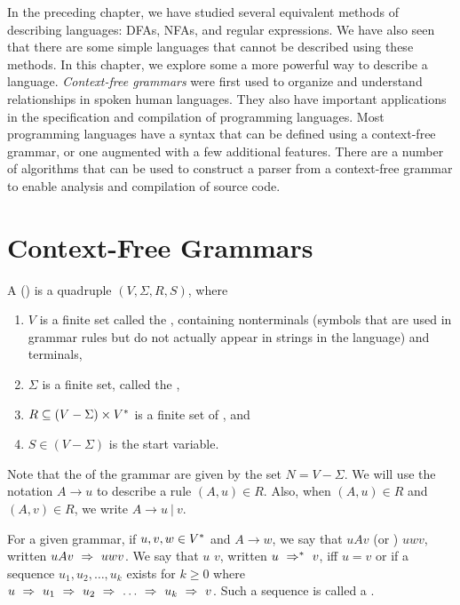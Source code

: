 \documentclass[twoside,letterpaper,openany]{book}
\begin{document}
\begin{discussion}
In the preceding chapter, we have studied several equivalent methods of describing languages: DFAs, NFAs, and regular expressions. We have also seen that there are some simple languages that cannot be described using these methods. In this chapter, we explore some a more powerful way to describe a language. \emph{Context-free grammars} were first used to organize and understand relationships in spoken human languages. They also have important applications in the specification and compilation of programming languages. Most programming languages have a syntax that can be defined using a context-free grammar, or one augmented with a few additional features. There are a number of algorithms that can be used to construct a parser from a context-free grammar to enable analysis and compilation of source code. 
\end{discussion}

\section{Context-Free Grammars}

\begin{defn}
A  () is a quadruple $(V, \Sigma, R, S)$, where
\begin{enumerate}
\item $V$ is a finite set called the , containing nonterminals (symbols that are used in grammar rules but do not actually appear in strings in the language) and terminals,
\item $\Sigma$ is a finite set, called the ,
\item $R \subseteq (V-\Sigma) \times V^{*}$ is a finite set of , and
\item $S \in (V-\Sigma)$ is the start variable.
\end{enumerate}

Note that the  of the grammar are given by the set $N = V - \Sigma$. We will use the notation $A \to u$ to describe a rule $(A, u) \in R$. Also, when $(A, u) \in R$ and $(A, v) \in R$, we write $A \to u~|~v$.
\end{defn}

\begin{defn}
For a given grammar, if $u, v, w \in V^{*}$ and $A \to w$, we say that $uAv$  (or ) $uwv$, written $uAv \ \Rightarrow\  uwv$. We say that $u$  $v$, written $u \ \Rightarrow^*\  v$, iff $u = v$ or if a sequence $u_1, u_2, \ldots, u_k$ exists for $k \geq 0$ where 
$ u \ \Rightarrow\  u_1 \ \Rightarrow\  u_2 \ \Rightarrow\  \ldots \ \Rightarrow\  u_k \ \Rightarrow\  v$. Such a sequence is called a . 
\end{defn}
\end{document}

